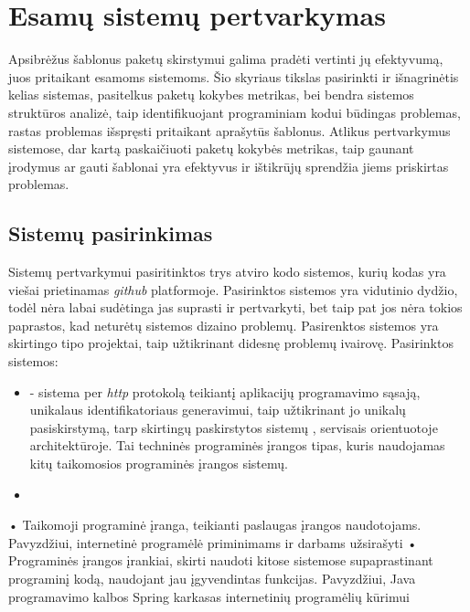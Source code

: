 \section{Esamų sistemų pertvarkymas}
Apsibrėžus šablonus paketų skirstymui galima pradėti vertinti jų efektyvumą, juos pritaikant esamoms sistemoms.
Šio skyriaus tikslas pasirinkti ir išnagrinėtis kelias sistemas, pasitelkus paketų kokybes metrikas, bei bendra sistemos struktūros analizė,
taip identifikuojant programiniam kodui būdingas problemas, rastas problemas išspręsti pritaikant aprašytūs šablonus.
Atlikus pertvarkymus sistemose, dar kartą paskaičiuoti paketų kokybės metrikas, taip gaunant įrodymus ar gauti šablonai yra efektyvus ir ištikrūjų sprendžia
jiems priskirtas problemas.


\subsection{Sistemų pasirinkimas}
Sistemų pertvarkymui pasiritinktos trys atviro kodo sistemos, kurių kodas yra viešai prietinamas \textit{github} platformoje.
Pasirinktos sistemos yra vidutinio dydžio, todėl nėra labai sudėtinga jas suprasti ir pertvarkyti, bet taip pat jos nėra
tokios paprastos, kad neturėtų sistemos dizaino problemų.
Pasirenktos sistemos yra skirtingo tipo projektai, taip užtikrinant
didesnę problemų ivairovę.
Pasirinktos sistemos:
\begin{itemize}
    \item {} - sistema per \textit{http}
    protokolą teikiantį aplikacijų programavimo sąsają,
    unikalaus identifikatoriaus generavimui, taip užtikrinant jo unikalų pasiskirstymą, tarp skirtingų paskirstytos sistemų ,
    servisais orientuotoje  architektūroje.
    Tai techninės programinės įrangos tipas, kuris naudojamas kitų taikomosios programinės įrangos sistemų.
    \item
\end{itemize}
• Taikomoji programinė įranga, teikianti paslaugas įrangos naudotojams. Pavyzdžiui,
internetinė programėlė priminimams ir darbams užsirašyti
• Programinės įrangos įrankiai, skirti naudoti kitose sistemose supaprastinant programinį
kodą, naudojant jau įgyvendintas funkcijas. Pavyzdžiui, Java programavimo kalbos
Spring karkasas internetinių programėlių kūrimui



